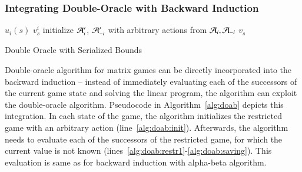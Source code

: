 \subsubsection{Integrating Double-Oracle with Backward Induction}
\begin{algorithm2e}[t]
\small
{}
 {\Return $u_i(s)$} \label{alg:doab:stop1}
 {
	\Return $v_s^{i}$
}
initialize $\mathcal{A}'_i$, $\mathcal{A}'_{-i}$ with arbitrary actions from $\mathcal{A}_i, \mathcal{A}_{-i}$\; \label{alg:doab:init}
\Return $v_s$ \label{alg:doab:stop2}
\caption{Double Oracle with Serialized Bounds}\label{alg:doab}
\end{algorithm2e}

Double-oracle algorithm for matrix games can be directly incorporated into the backward induction -- instead of immediately evaluating each of the successors of the current game state and solving the linear program, the algorithm can exploit the double-oracle algorithm. Pseudocode in Algorithm~\ref{alg:doab} depicts this integration. In each state of the game, the algorithm initializes the restricted game with an arbitrary action (line~\ref{alg:doab:init}). Afterwards, the algorithm needs to evaluate each of the successors of the restricted game, for which the current value is not known (lines~\ref{alg:doab:restr1}-\ref{alg:doab:saving}). This evaluation is same as for backward induction with alpha-beta algorithm. 

